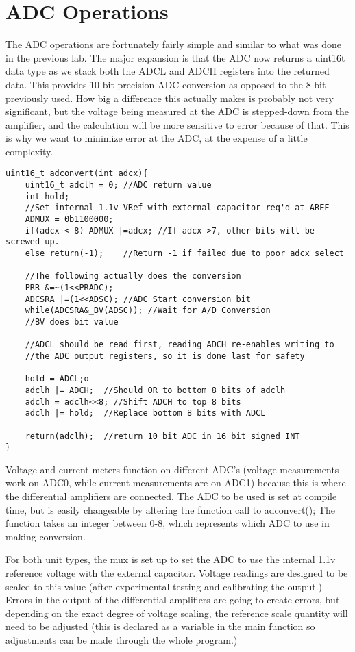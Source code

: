 \section{ADC Operations}


The ADC operations are fortunately fairly simple and similar to what was done in the previous lab. The major expansion is that the ADC now returns a uint16t data type as we stack both the ADCL and ADCH registers into the returned data. This provides 10 bit precision ADC conversion as opposed to the 8 bit previously used. How big a difference this actually makes is probably not very significant, but the voltage being measured at the ADC is stepped-down from the amplifier, and the calculation will be more sensitive to error because of that. This is why we want to minimize error at the ADC, at the expense of a little complexity.

\begin{lstlisting}
uint16_t adconvert(int adcx){
	uint16_t adclh = 0;	//ADC return value
	int hold;
	//Set internal 1.1v VRef with external capacitor req'd at AREF
	ADMUX = 0b1100000;
	if(adcx < 8) ADMUX |=adcx; //If adcx >7, other bits will be screwed up.
	else return(-1);	//Return -1 if failed due to poor adcx select
	
	//The following actually does the conversion
	PRR &=~(1<<PRADC);
	ADCSRA |=(1<<ADSC);	//ADC Start conversion bit
	while(ADCSRA&_BV(ADSC)); //Wait for A/D Conversion
	//BV does bit value
	
	//ADCL should be read first, reading ADCH re-enables writing to
	//the ADC output registers, so it is done last for safety
	
	hold = ADCL;o
	adclh |= ADCH;	//Should OR to bottom 8 bits of adclh
	adclh = adclh<<8; //Shift ADCH to top 8 bits
	adclh |= hold;	//Replace bottom 8 bits with ADCL
	
	return(adclh);	//return 10 bit ADC in 16 bit signed INT
}
\end{lstlisting}

Voltage and current meters function on different ADC's (voltage measurements work on ADC0, while current measurements are on ADC1) because this is where the differential amplifiers are connected. The ADC to be used is set at compile time, but is easily changeable by altering the function call to adconvert(); The function takes an integer between 0-8, which represents which ADC to use in making conversion.

For both unit types, the mux is set up to set the ADC to use the internal 1.1v reference voltage with the external capacitor. Voltage readings are designed to be scaled to this value (after experimental testing and calibrating the output.) Errors in the output of the differential amplifiers are going to create errors, but depending on the exact degree of voltage scaling, the reference scale quantity will need to be adjusted (this is declared as a variable in the main function so adjustments can be made through the whole program.)